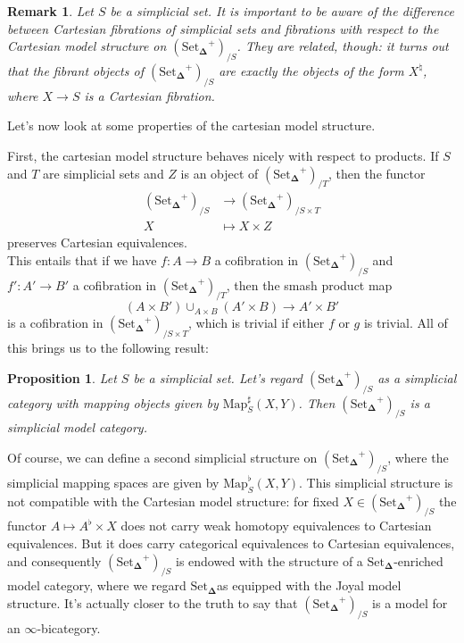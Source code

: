 \documentclass{amsart}
\newcommand{\8}{\ensuremath{\infty}}
\newcommand{\SSet}{\ensuremath{\text{Set}_{\boldsymbol{\Delta}}}}
\newcommand{\Map}{\ensuremath{\text{Map}}}
\newtheorem{proposition}{Proposition}
\newtheorem{remark}{Remark}
\begin{document}
\begin{remark}
  Let $S$ be a simplicial set. It is important to be aware of the difference between Cartesian fibrations of simplicial sets and fibrations with respect to the Cartesian model structure on $(\SSet^+)_{/S}$. They are related, though: it turns out that the fibrant objects of $(\SSet^+)_{/S}$ are exactly the objects of the form $X^\natural$, where $X\rightarrow S$ is a Cartesian fibration.
\end{remark}

Let's now look at some properties of the cartesian model structure.

First, the cartesian model structure behaves nicely with respect to products. If $S$ and $T$ are simplicial sets and $Z$ is an object of $(\SSet^+)_{/T}$, then the functor\begin{align*}(\SSet^+)_{/S}&\rightarrow (\SSet^+)_{/S\times T}\\
X&\mapsto X\times Z \end{align*}
preserves Cartesian equivalences.\\
This entails that if we have $f:A\rightarrow B$ a cofibration in $(\SSet^+)_{/S}$ and $f':A'\rightarrow B'$ a cofibration in $(\SSet^+)_{/T}$, then the smash product map
\[(A\times B')\displaystyle \cup_{A\times B}(A'\times B)\rightarrow A'\times B'\] is a cofibration in $(\SSet^+)_{/S\times T}$, which is trivial if either $f$ or $g$ is trivial. All of this brings us to the following result:

\begin{proposition}
  Let $S$ be a simplicial set. Let's regard $(\SSet^+)_{/S}$ as a simplicial category with mapping objects given by $\Map^\sharp_S(X,Y)$. Then $(\SSet^+)_{/S}$ is a simplicial model category.
\end{proposition}

Of course, we can define a second simplicial structure on $(\SSet^+)_{/S}$, where the simplicial mapping spaces are given by $\Map^\flat_S(X,Y)$. This simplicial structure is not compatible with the Cartesian model structure: for fixed $X\in(\SSet^+)_{/S}$ the functor $A\mapsto A^\flat\times X$ does not carry weak homotopy equivalences to Cartesian equivalences. But it does carry categorical equivalences to Cartesian equivalences, and consequently $(\SSet^+)_{/S}$ is endowed with the structure of a \SSet-enriched model category, where we regard \SSet as equipped with the Joyal model structure. It's actually closer to the truth to say that $(\SSet^+)_{/S}$ is a model for an \8-bicategory.
\end{document}
